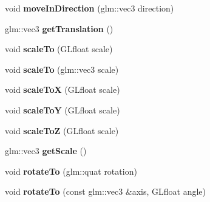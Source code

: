 \begin{DoxyCompactItemize}
\item 
\mbox{\label{classflw_1_1flf_1_1Moveable_affaa14cfeea1303a4d804bea6dcb1173}} 
void {\bfseries move\+In\+Direction} (glm\+::vec3 direction)
\item 
\mbox{\label{classflw_1_1flf_1_1Moveable_a8f2b95a106185b8ee085160ede5d3ea2}} 
glm\+::vec3 {\bfseries get\+Translation} ()
\item 
\mbox{\label{classflw_1_1flf_1_1Moveable_a659291049e8fcd3b40310071153376bf}} 
void {\bfseries scale\+To} (G\+Lfloat scale)
\item 
\mbox{\label{classflw_1_1flf_1_1Moveable_affd0d57a98488c5ffb4cd01b25335412}} 
void {\bfseries scale\+To} (glm\+::vec3 scale)
\item 
\mbox{\label{classflw_1_1flf_1_1Moveable_ac1f549c149073e68838e11b9234882b4}} 
void {\bfseries scale\+ToX} (G\+Lfloat scale)
\item 
\mbox{\label{classflw_1_1flf_1_1Moveable_afa12ca10b1a0e2f6b0fc5f39a130b3cb}} 
void {\bfseries scale\+ToY} (G\+Lfloat scale)
\item 
\mbox{\label{classflw_1_1flf_1_1Moveable_a6c4b8fb62c8bc1c7596951df866b4969}} 
void {\bfseries scale\+ToZ} (G\+Lfloat scale)
\item 
\mbox{\label{classflw_1_1flf_1_1Moveable_ae3ebdf49929ae87e02555c54ea9cf49f}} 
glm\+::vec3 {\bfseries get\+Scale} ()
\item 
\mbox{\label{classflw_1_1flf_1_1Moveable_af45bf4631f6e0af6bb876aa7257ffac1}} 
void {\bfseries rotate\+To} (glm\+::quat rotation)
\item 
\mbox{\label{classflw_1_1flf_1_1Moveable_af0bb11c2db725cf96d346bf890f99a88}} 
void {\bfseries rotate\+To} (const glm\+::vec3 \&axis, G\+Lfloat angle)
\item 
\mbox{\label{classflw_1_1flf_1_1Moveable_a26bea12bc986d6fbd74b9de2fc5853c8}} 

\end{DoxyCompactItemize}
